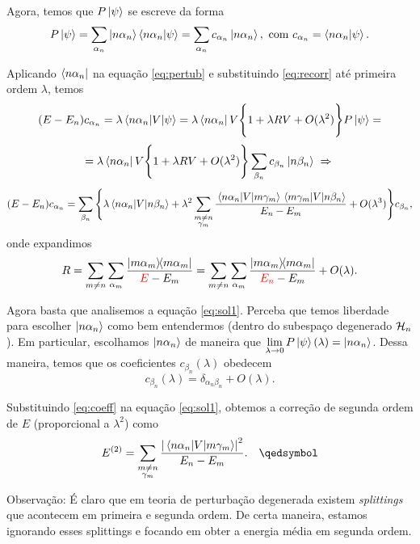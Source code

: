 \documentclass[a4paper,10pt]{article}
\begin{document}
Agora, temos que $P \ket{\psi}$ se escreve da forma
$$
P \ket{\psi} = \sum_{\alpha_n} \ket{n \alpha_n} \braket{n\alpha_n}{\psi} =
\sum_{\alpha_n} c_{\alpha_n} \ket{n \alpha_n}, \text{ com } c_{\alpha_n} = \braket{n\alpha_n}{\psi}.
$$

Aplicando $\bra{n \alpha_n}$ na equação \ref{eq:pertub} e substituindo \ref{eq:recorr} até primeira ordem $\lambda$, temos
$$
(E - E_n) c_{\alpha_n} = \lambda \mel{n \alpha_n}{V}{\psi} =
\lambda \bra{n \alpha_n} V \Bigg\{ 1 + \lambda R V + O(\lambda^2) \Bigg\} P \ket{\psi} =
$$
$$
=
\lambda \bra{n \alpha_n} V \Bigg\{ 1 + \lambda R V + O(\lambda^2) \Bigg\} \sum_{\beta_n} c_{\beta_n} \ket{n \beta_n} \; \Rightarrow \;
$$
\begin{equation} \label{eq:sol1}
(E - E_n) c_{\alpha_n} =
\sum_{\beta_n} \Bigg\{
\lambda \mel{n \alpha_n}{V}{n \beta_n} + \lambda^2 \sum_{\substack{m \neq n \\ \gamma_m}}
\frac{\mel{n \alpha_n}{V}{m \gamma_m} \mel{m \gamma_m}{V}{n \beta_n}}{E_n - E_m} + O(\lambda^3)
\Bigg\} c_{\beta_n},
\end{equation}
onde expandimos
$$
R = \sum_{m \neq n} \sum_{\alpha_m} \frac{\ketbra{m \alpha_m}}{\textcolor{red}{E} - E_m}
= \sum_{m \neq n} \sum_{\alpha_m} \frac{\ketbra{m \alpha_m}}{\textcolor{red}{E_n} - E_m} + O(\lambda).
$$

Agora basta que analisemos a equação \ref{eq:sol1}. Perceba que temos liberdade para escolher $\ket{n \alpha_n}$ como bem entendermos (dentro do subespaço degenerado $\mathcal{H}_n$). Em particular, escolhamos $\ket{n \alpha_n}$ de maneira que $\displaystyle{\lim_{\lambda \to 0} P \ket{\psi} (\lambda) = \ket{n \alpha_n}}$. Dessa maneira, temos que os coeficientes $c_{\beta_n}(\lambda)$ obedecem
\begin{equation} \label{eq:coeff}
c_{\beta_n}(\lambda) = \delta_{\alpha_n \beta_n} + O(\lambda).
\end{equation}

Substituindo \ref{eq:coeff} na equação \ref{eq:sol1}, obtemos a correção de segunda ordem de $E$ (proporcional a $\lambda^2$) como
$$
E^{(2)} = \sum_{\substack{m \neq n \\ \gamma_m}} \frac{\abs{\mel{n \alpha_n}{V}{m \gamma_m}}^2}{E_n - E_m}.
\quad \qedsymbol
$$

Observação: É claro que em teoria de perturbação degenerada existem \textit{splittings} que acontecem em primeira e segunda ordem. De certa maneira, estamos ignorando esses splittings e focando em obter a energia média em segunda ordem.
\end{document}

